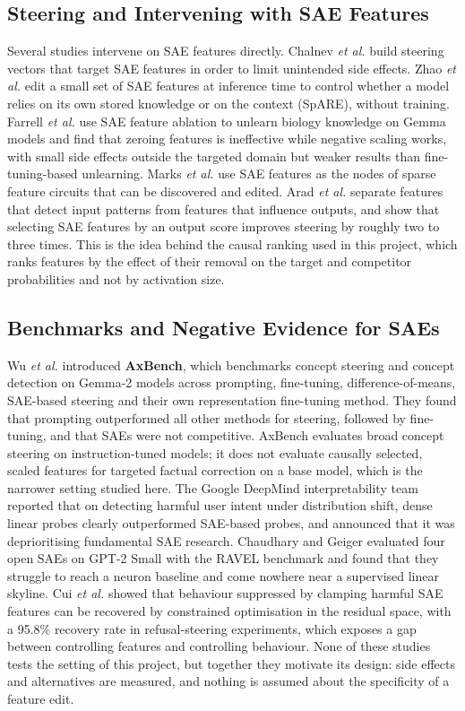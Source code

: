 \documentclass[12pt,a4paper]{report}
\begin{document}
\subsection{Steering and Intervening with SAE Features}

Several studies intervene on SAE features directly. Chalnev \textit{et al.} \cite{r28} build steering vectors that target SAE features in order to limit unintended side effects. Zhao \textit{et al.} \cite{r29} edit a small set of SAE features at inference time to control whether a model relies on its own stored knowledge or on the context (SpARE), without training. Farrell \textit{et al.} \cite{r27} use SAE feature ablation to unlearn biology knowledge on Gemma models and find that zeroing features is ineffective while negative scaling works, with small side effects outside the targeted domain but weaker results than fine-tuning-based unlearning. Marks \textit{et al.} \cite{r33} use SAE features as the nodes of sparse feature circuits that can be discovered and edited. Arad \textit{et al.} \cite{r23} separate features that detect input patterns from features that influence outputs, and show that selecting SAE features by an output score improves steering by roughly two to three times. This is the idea behind the causal ranking used in this project, which ranks features by the effect of their removal on the target and competitor probabilities and not by activation size.

\subsection{Benchmarks and Negative Evidence for SAEs}

Wu \textit{et al.} \cite{r12} introduced \textbf{AxBench}, which benchmarks concept steering and concept detection on Gemma-2 models across prompting, fine-tuning, difference-of-means, SAE-based steering and their own representation fine-tuning method. They found that prompting outperformed all other methods for steering, followed by fine-tuning, and that SAEs were not competitive. AxBench evaluates broad concept steering on instruction-tuned models; it does not evaluate causally selected, scaled features for targeted factual correction on a base model, which is the narrower setting studied here. The Google DeepMind interpretability team reported \cite{r24} that on detecting harmful user intent under distribution shift, dense linear probes clearly outperformed SAE-based probes, and announced that it was deprioritising fundamental SAE research. Chaudhary and Geiger \cite{r25} evaluated four open SAEs on GPT-2 Small with the RAVEL benchmark and found that they struggle to reach a neuron baseline and come nowhere near a supervised linear skyline. Cui \textit{et al.} \cite{r26} showed that behaviour suppressed by clamping harmful SAE features can be recovered by constrained optimisation in the residual space, with a 95.8\% recovery rate in refusal-steering experiments, which exposes a gap between controlling features and controlling behaviour. None of these studies tests the setting of this project, but together they motivate its design: side effects and alternatives are measured, and nothing is assumed about the specificity of a feature edit.
\end{document}

